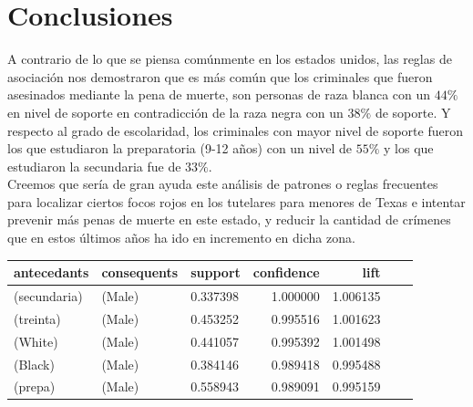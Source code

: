 \documentclass[sigconf]{acmart}
\begin{document}
\section{Conclusiones}
A contrario de lo que se piensa comúnmente en los estados unidos, las reglas de asociación nos demostraron que es más común que los criminales que fueron asesinados mediante la pena de muerte, son personas de raza blanca con un $44\%$ en nivel de soporte en contradicción de la raza negra con un $38\%$ de soporte. Y respecto al grado de escolaridad, los criminales con mayor nivel de soporte fueron los que estudiaron la preparatoria (9-12 años) con un nivel de $55\%$ y los que estudiaron la secundaria fue de $33\%$.\\ Creemos que sería de gran ayuda este análisis de patrones o reglas frecuentes para localizar ciertos focos rojos en los tutelares para menores de Texas e intentar prevenir más penas de muerte en este estado, y reducir la cantidad de crímenes que en estos últimos años ha ido en incremento en dicha zona.\\
\begin{tabular}{lllrrrr}
\toprule
  antecedants & consequents &   support &  confidence &      lift \\
\midrule
  (secundaria) &      (Male) &  0.337398 &    1.000000 &  1.006135 \\
     (treinta) &      (Male) &  0.453252 &    0.995516 &  1.001623  \\
       (White) &      (Male) &  0.441057 &    0.995392 &  1.001498 \\
     (Black) &      (Male) &  0.384146 &    0.989418 &  0.995488  \\
      (prepa) &      (Male) &  0.558943 &    0.989091 &  0.995159 \\
\bottomrule
\end{tabular}



{}


 
\end{document}
